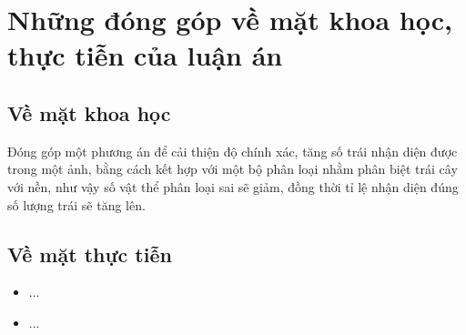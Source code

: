 \section{Những đóng góp về mặt khoa học, thực tiễn của luận án}
\subsection{Về mặt khoa học}
Đóng góp một phương án để cải thiện độ chính xác, tăng số trái nhận diện được trong một ảnh, bằng cách kết hợp với một bộ phân loại nhằm phân biệt trái cây với nền, như vậy số vật thể phân loại sai sẽ giảm, đồng thời tỉ lệ nhận diện đúng số lượng trái sẽ tăng lên.
\subsection{Về mặt thực tiễn}
\begin{itemize}
	\item ...
	\item ...
\end{itemize}
